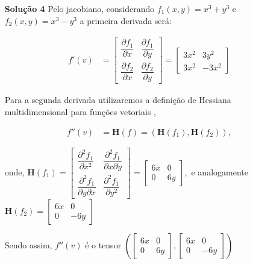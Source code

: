 \documentclass[12pt,letterpaper]{article}
\newcommand{\sol}[1]{\textbf{Solução #1}}
\newcommand{\bd}[1]{\boldsymbol{#1}}
\begin{document}
\begin{enumerate}
{	determine suas derivadas $f'(v)$ e $f''(v)$
}
	\item[\sol{4}] Pelo jacobiano, considerando $f_1(x,y)=x^3+y^3$ e $f_2(x,y)=x^3-y^3$ a primeira derivada será:
	
	\begin{align*}
		f'(v)&=\displaystyle\begin{bmatrix}
			\dfrac{\partial f_1}{\partial x} & 
			\dfrac{\partial f_1}{\partial y}  \\[3ex] %
			\dfrac{\partial f_2}{\partial x} & 
			\dfrac{\partial f_2}{\partial y} 
		\end{bmatrix}
	=\begin{bmatrix}
		3x^2 & 
		3y^2  \\[0.5ex] %
		3x^2 & 
		-3x^2 
	\end{bmatrix}
	\end{align*}
	
	Para a segunda derivada utilizaremos a definição de Hessiana multidimensional para funções vetoriais \cite{wiki:Hessian_matrix}, 
	
	\begin{align*}
		f''(v)&=\bd{H}(f)=(\bd H (f_1),\bd H (f_2)),
	\end{align*}
	
	onde, 
	$
		\bd H (f_1)=\begin{bmatrix}
			\dfrac{\partial^2f_1}{\partial x^2} & 
			\dfrac{\partial ^2f_1}{\partial x\partial y}  \\[3ex] %
			\dfrac{\partial^2 f_1}{\partial y\partial x} & 
			\dfrac{\partial^2 f_1}{\partial y^2}
		\end{bmatrix} =
	\begin{bmatrix}
		6x & 
		0  \\[0.5ex] %
		0 & 
		6y
	\end{bmatrix},
	$
	e analogamente $\bd H(f_2)=\begin{bmatrix}
		6x & 
		0  \\[0.5ex] %
		0 & 
		-6y
	\end{bmatrix}$

Sendo assim, $f''(v)$ é o tensor $\left(\begin{bmatrix}
	6x & 
	0  \\[0.5ex] %
	0 & 
	6y
\end{bmatrix},\begin{bmatrix}
6x & 
0  \\[0.5ex] %
0 & 
-6y
\end{bmatrix}\right)$	
	

\end{enumerate}
\end{document}
